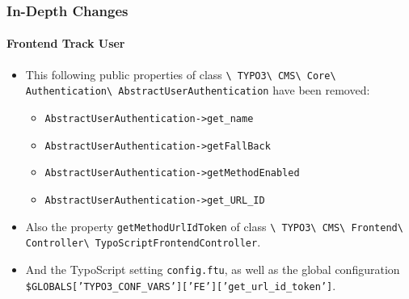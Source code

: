
\begin{frame}[fragile]
	\frametitle{In-Depth Changes}
	\framesubtitle{Frontend Track User}

	\begin{itemize}

		\item This following public properties of class\newline
			\smaller\texttt{\textbackslash
				TYPO3\textbackslash
				CMS\textbackslash
				Core\textbackslash
				Authentication\textbackslash
				AbstractUserAuthentication}
			\normalsize\newline
			have been removed:

			\begin{itemize}\smaller
				\item \texttt{AbstractUserAuthentication->get\_name}
				\item \texttt{AbstractUserAuthentication->getFallBack}
				\item \texttt{AbstractUserAuthentication->getMethodEnabled}
				\item \texttt{AbstractUserAuthentication->get\_URL\_ID}
			\end{itemize}\normalsize

		\item Also the property \texttt{getMethodUrlIdToken} of class\newline
			\smaller\texttt{\textbackslash
				TYPO3\textbackslash
				CMS\textbackslash
				Frontend\textbackslash
				Controller\textbackslash
				TypoScriptFrontendController}.
			\normalsize

		\item And the TypoScript setting \texttt{config.ftu},
			as well as the global configuration
			{\fontsize{8}{8} \selectfont \texttt{\$GLOBALS['TYPO3\_CONF\_VARS']['FE']['get\_url\_id\_token']}.}

	\end{itemize}

\end{frame}


